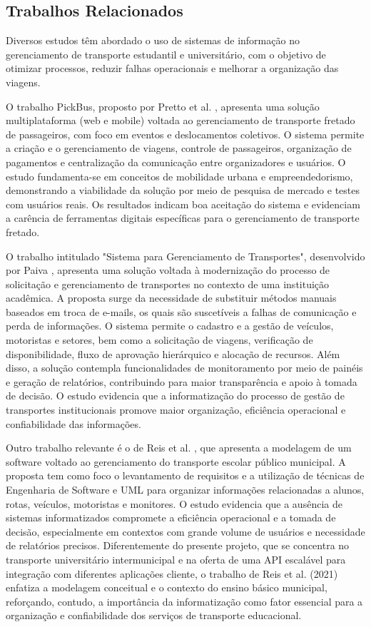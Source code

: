 \subsection{Trabalhos Relacionados}
\label{sec:trabalhos-relacionados}

Diversos estudos têm abordado o uso de sistemas de informação no gerenciamento de transporte estudantil e universitário, com o objetivo de otimizar processos, reduzir falhas operacionais e melhorar a organização das viagens.

O trabalho PickBus, proposto por Pretto et al. \cite{pickbus2021}, apresenta uma solução multiplataforma (web e mobile) voltada ao gerenciamento de transporte fretado de passageiros, com foco em eventos e deslocamentos coletivos. O sistema permite a criação e o gerenciamento de viagens, controle de passageiros, organização de pagamentos e centralização da comunicação entre organizadores e usuários. O estudo fundamenta-se em conceitos de mobilidade urbana e empreendedorismo, demonstrando a viabilidade da solução por meio de pesquisa de mercado e testes com usuários reais. Os resultados indicam boa aceitação do sistema e evidenciam a carência de ferramentas digitais específicas para o gerenciamento de transporte fretado.

O trabalho intitulado "Sistema para Gerenciamento de Transportes", desenvolvido por Paiva \cite{anderson2020}, apresenta uma solução voltada à modernização do processo de solicitação e gerenciamento de transportes no contexto de uma instituição acadêmica. A proposta surge da necessidade de substituir métodos manuais baseados em troca de e-mails, os quais são suscetíveis a falhas de comunicação e perda de informações. O sistema permite o cadastro e a gestão de veículos, motoristas e setores, bem como a solicitação de viagens, verificação de disponibilidade, fluxo de aprovação hierárquico e alocação de recursos. Além disso, a solução contempla funcionalidades de monitoramento por meio de painéis e geração de relatórios, contribuindo para maior transparência e apoio à tomada de decisão. O estudo evidencia que a informatização do processo de gestão de transportes institucionais promove maior organização, eficiência operacional e confiabilidade das informações.

Outro trabalho relevante é o de Reis et al. \cite{reis2021transporte}, que apresenta a modelagem de um software voltado ao gerenciamento do transporte escolar público municipal. A proposta tem como foco o levantamento de requisitos e a utilização de técnicas de Engenharia de Software e UML para organizar informações relacionadas a alunos, rotas, veículos, motoristas e monitores. O estudo evidencia que a ausência de sistemas informatizados compromete a eficiência operacional e a tomada de decisão, especialmente em contextos com grande volume de usuários e necessidade de relatórios precisos. Diferentemente do presente projeto, que se concentra no transporte universitário intermunicipal e na oferta de uma API escalável para integração com diferentes aplicações cliente, o trabalho de Reis et al. (2021) enfatiza a modelagem conceitual e o contexto do ensino básico municipal, reforçando, contudo, a importância da informatização como fator essencial para a organização e confiabilidade dos serviços de transporte educacional.

